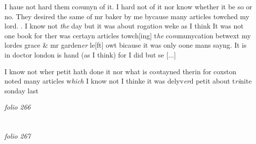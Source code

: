 \documentclass[12pt, a4paper]{book}
\begin{document}
				\marginpar[\vspace{0.5cm}{\textcolor{Gray}{24.}}]{}
			 I haue not hard them co\textit{m}myn of it.  
				\marginpar[\vspace{0.5cm}{\textcolor{Gray}{25.}}]{}
			 I hard not of it nor know whether it be so or no.  
				\marginpar[\vspace{0.5cm}{\textcolor{Gray}{26.}}]{}
			 They desired the same of mr baker by me bycause many  articles towched my lord.  
				\marginpar[\vspace{0.5cm}{\textcolor{Gray}{27}}]{}
			. I know not \textit{the} day but it was about rogatio\textit{n} weke as I think 
				\marginpar[\vspace{0.5cm}{\textcolor{Gray}{28.29.}}]{}
			 It was not one book for ther was certayn articles towch[ing] t\textit{he} co\textit{m}munycation betwext my lordes grace \& mr garden\textit{er} le[ft] owt bicause it was only oone mans sayng. 
				\marginpar[\vspace{0.5cm}{\textcolor{Gray}{30.}}]{}
			 It is in doctor london is hand (as I think) for I did but se
				[...]
			 
				\marginpar[\vspace{0.5cm}{\textcolor{Gray}{31.}}]{}
			 I know not wher petit hath done it nor what is co\textit{n}tayned therin for coxston noted many articles w\textit{hich} I know not  I thinke it was delyv\textit{er}d petit about t\textit{ri}nite sonday last

\dotfill
					

\textit{folio 266}


         \vspace{4cm}
         
\dotfill
					  \section*{}

\textit{folio 267}
\end{document}
